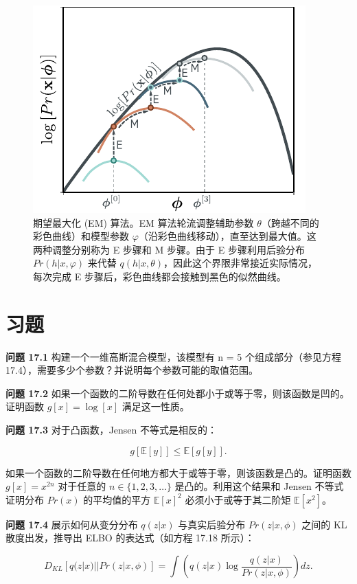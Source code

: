 \documentclass[lang=cn,newtx,10pt,scheme=chinese]{elegantbook}
\begin{document}
\begin{figure}[ht!]
\centering
\includegraphics[width=0.7\linewidth]{PDFFigures/UDLChap17PDF/VAEEMOpt.pdf}
\caption{期望最大化 (EM) 算法。EM 算法轮流调整辅助参数 \(\theta\)（跨越不同的彩色曲线）和模型参数 \(\varphi\)（沿彩色曲线移动），直至达到最大值。这两种调整分别称为 E 步骤和 M 步骤。由于 E 步骤利用后验分布 \(Pr(h|x, \varphi)\) 来代替 \(q(h|x, \theta)\)，因此这个界限非常接近实际情况，每次完成 E 步骤后，彩色曲线都会接触到黑色的似然曲线。}
\end{figure}

\section{习题}  
\textbf{问题 17.1} 构建一个一维高斯混合模型，该模型有 n = 5 个组成部分（参见方程 17.4），需要多少个参数？并说明每个参数可能的取值范围。

\textbf{问题 17.2} 如果一个函数的二阶导数在任何处都小于或等于零，则该函数是凹的。证明函数 \(g[x] = \log[x]\) 满足这一性质。

\textbf{问题 17.3} 对于凸函数，Jensen 不等式是相反的：

\begin{equation}
g[\mathbb{E}[y]] \leq \mathbb{E}[g[y]]. 
\end{equation}

如果一个函数的二阶导数在任何地方都大于或等于零，则该函数是凸的。证明函数 \(g[x] = x^{2n}\) 对于任意的 \(n \in \{1, 2, 3, \ldots\}\) 是凸的。利用这个结果和 Jensen 不等式证明分布 \(Pr(x)\) 的平均值的平方 \(\mathbb{E}[x]^2\) 必须小于或等于其二阶矩 \(\mathbb{E}[x^2]\)。

\textbf{问题 17.4} 展示如何从变分分布 \(q(z|x)\) 与真实后验分布 \(Pr(z|x, \phi)\) 之间的 KL 散度出发，推导出 ELBO 的表达式（如方程 17.18 所示）：

\begin{equation}
D_{KL} [q(z|x) || Pr(z|x, \phi)] = \int (q(z|x) \log \frac{q(z|x)}{Pr(z|x, \phi)}) dz. 
\end{equation}
\end{document}
